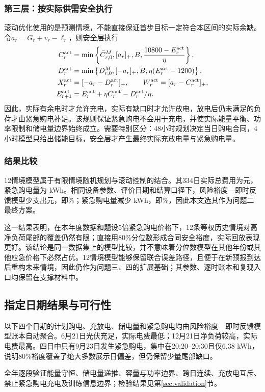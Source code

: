 \documentclass[UTF8,fontset=none,12pt,a4paper]{ctexart}
\newcommand{\sourceinput}[1]{}
\begin{document}
\subsubsection{第三层：按实际供需安全执行}
滚动优化使用的是预测情境，不能直接保证首步目标一定符合本区间的实际余缺。令$a_r=G_r+v_r-\ell_r$，则安全层执行
\begin{align}
 C_r^{\rm act}&=\min\left\{\bar C_{r,0}^{M},[a_r]_+,B,
 \frac{10800-E_r^{\rm act}}{\eta}\right\},\nonumber\\
 D_r^{\rm act}&=\min\left\{\bar D_{r,0}^{M},[-a_r]_+,B,
 \eta(E_r^{\rm act}-1200)\right\},\nonumber\\
 X_r^{\rm act}&=[-a_r-D_r^{\rm act}]_+,\qquad
 W_r^{\rm act}=[a_r-C_r^{\rm act}]_+,\nonumber\\
 E_{r+1}^{\rm act}&=E_r^{\rm act}+\eta C_r^{\rm act}-D_r^{\rm act}/\eta.
 \label{eq:q2scenario-execution}
\end{align}
因此，实际有余电时才允许充电，实际有缺口时才允许放电，放电后仍未满足的负荷才由紧急购电补足。该规则保证紧急购电不会用于充电，并使实际能量平衡、功率限制和储电量边界始终成立。需要特别区分：48小时规划决定当日购电合同，4小时模型只给出储能目标，安全层才产生最终实际充放电量与紧急购电量。

\subsubsection{结果比较}
12情境模型属于有限情境随机规划与滚动控制的结合\cite{shapiro,rawlings,parisio}。其334日实际总费用为\QTwoReferenceCost 元，紧急购电量为\QTwoReferenceEmergencyEnergy{} kWh。相同设备参数、评价日期和结算口径下，风险裕度—即时反馈模型少支出\QTwoReferenceSaving 元，即\QTwoReferenceSavingPct\%；紧急购电量减少\QTwoReferenceEmergencySaving{} kWh，即\QTwoReferenceEmergencySavingPct\%，因此本文选其作为问题二最终方案。

这一结果表明，在本年度数据和题设5倍紧急购电价格下，12条等权历史情境对高净负荷尾部的覆盖仍然有限；直接用80\%分位数形成合同安全裕度，实际回放表现更好。该结论是同一数据集上的模型比较，并不意味着分位数模型在其他年份或其他应急价格下必然占优。12情境模型能够保留联合误差路径，且便于在新预报到达后重构未来情境，因此仍作为问题三、四的扩展基础；其参数、逐时账本和复现入口均保留在支撑材料中。

\subsection{指定日期结果与可行性}
以下四个日期的计划购电、充放电、储电量和紧急购电均由风险裕度—即时反馈模型账本自动聚合。6月21日光伏充足，实际电费最低；12月21日净负荷较高，实际电费最高。四日中只有9月23日发生紧急购电，集中在20:20--20:30且仅6.38 kWh，说明80\%裕度覆盖了绝大多数展示日偏差，但仍保留少量尾部缺口。
\sourceinput{tables_q2}
\sourceinput{day_interpretations_q2}
全年逐段验证能量守恒、储电量递推、容量与功率边界、跨日连续、充放电互斥、禁止紧急购电充电及训练信息边界；检验结果见第\ref{sec:validation}节。
\FloatBarrier
\end{document}
